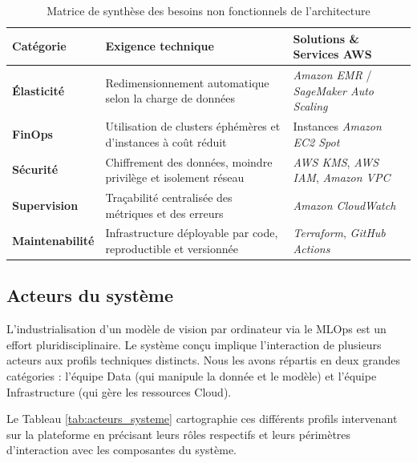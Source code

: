 \begin{table}[H]
\centering
\caption{Matrice de synthèse des besoins non fonctionnels de l'architecture}
\label{tab:besoins_non_fonctionnels}
\renewcommand{\arraystretch}{1.4}
\begin{tabular}{|p{3cm}|p{6cm}|p{5cm}|}
\hline
\rowcolor{darkgreen!20} \textbf{Catégorie} & \textbf{Exigence technique} & \textbf{Solutions \& Services AWS} \\ \hline
\textbf{Élasticité} & Redimensionnement automatique selon la charge de données & \textit{Amazon EMR} / \textit{SageMaker Auto Scaling} \\ \hline
\textbf{FinOps} & Utilisation de clusters éphémères et d'instances à coût réduit & Instances \textit{Amazon EC2 Spot} \\ \hline
\textbf{Sécurité} & Chiffrement des données, moindre privilège et isolement réseau & \textit{AWS KMS}, \textit{AWS IAM}, \textit{Amazon VPC} \\ \hline
\textbf{Supervision} & Traçabilité centralisée des métriques et des erreurs & \textit{Amazon CloudWatch} \\ \hline
\textbf{Maintenabilité} & Infrastructure déployable par code, reproductible et versionnée & \textit{Terraform}, \textit{GitHub Actions} \\ \hline
\end{tabular}
\end{table}

\subsection{Acteurs du système}
L'industrialisation d'un modèle de vision par ordinateur via le MLOps est un effort pluridisciplinaire. Le système conçu implique l'interaction de plusieurs acteurs aux profils techniques distincts. Nous les avons répartis en deux grandes catégories : l'équipe Data (qui manipule la donnée et le modèle) et l'équipe Infrastructure (qui gère les ressources Cloud).

Le Tableau \ref{tab:acteurs_systeme} cartographie ces différents profils intervenant sur la plateforme en précisant leurs rôles respectifs et leurs périmètres d'interaction avec les composantes du système.

